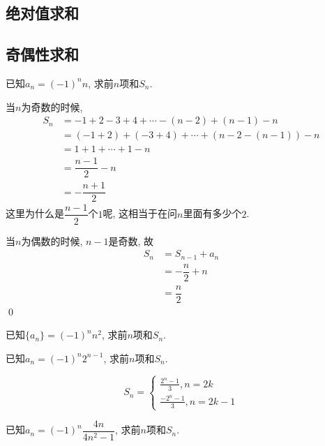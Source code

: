 \subsection{绝对值求和}
\clearpage
\subsection{奇偶性求和}
\begin{example}
    已知\(a_n=(-1)^nn\), 求前\(n\)项和\(S_n\).
\end{example}
\begin{jie}
    当\(n\)为奇数的时候, 
    \begin{align*}
        S_n&=-1+2-3+4+\cdots-(n-2)+(n-1)-n\\
           &=(-1+2)+(-3+4)+\cdots+(n-2-(n-1))-n\\
           &=1+1+\cdots+1-n\\
           &=\dfrac{n-1}{2}-n\\
           &=-\dfrac{n+1}{2}
    \end{align*}
    这里为什么是\(\dfrac{n-1}{2}\)个\(1\)呢, 这相当于在问\(n\)里面有多少个\(2\). 

    当\(n\)为偶数的时候, \(n-1\)是奇数, 故
    \begin{align*}
        S_n&=S_{n-1}+a_n\\
           &=-\dfrac{n}{2}+n\\
           &=\dfrac{n}{2}
    \end{align*}
    \qed
\end{jie}

\begin{exercise}
    已知\(\{a_n\}=(-1)^nn^2\), 求前\(n\)项和\(S_n\).
\end{exercise}
\begin{jie}
    
\end{jie}
\begin{exercise}
    已知\(a_n=(-1)^n 2^{n-1}\), 求前\(n\)项和\(S_n\).
\end{exercise}
\begin{jie}
    \[S_{n}=\left\{\begin{array}{l}
        \frac{2^{n}-1}{3}, n=2 k \\
        \frac{-2^{n}-1}{3}, n=2 k-1
        \end{array}\right.\]
\end{jie}
\begin{example}
    已知\(a_n=(-1)^{n} \dfrac{4 n}{4 n^{2}-1}\), 求前\(n\)项和\(S_n\).
\end{example}


